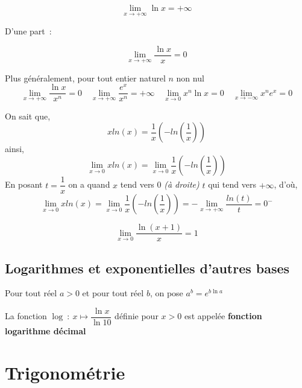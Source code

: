 \documentclass[french]{book}
\newcommand{\ds}{\displaystyle}
\newcommand{\limite}[2][x]{\ds\lim_{#1\rightarrow #2}}
\newcommand{\limpinf}[1][x]{\ds\lim_{#1\rightarrow +\infty}}
\newcommand{\fr}[2]{\dfrac{#1}{#2}}
\begin{document}
\begin{prop}
     $$\limpinf  \ln x=+\infty$$
    \end{prop}


\begin{prop}
D'une part~:

    $$\limpinf \dfrac{\ln x}{x}=0$$

Plus généralement, pour tout entier naturel $n$ non nul $$\limpinf\fr{\ln x}{x^n}=0\quad \limpinf \fr{e^x}{x^n}=+\infty\quad
\limite{0}x^n\ln x=0\quad \limite{-\infty}x^ne^x=0$$

\end{prop}

\begin{demo}[preuve de $ \limite{0} x ln(x)$ ]
On sait que, $$ x ln(x) = \dfrac{1}{x} (- ln( \dfrac{1}{x} )) $$ 
ainsi, 
$$ \limite{0} x ln(x)= \limite{0} \dfrac{1}{x} (- ln( \dfrac{1}{x} ))$$
En posant $t=\dfrac{1}{x}$   on a quand $x$ tend vers 0 \emph{(à droite)} $t$ qui tend vers $+ \infty$, d'où, 
 $$ \limite{0} x ln(x)=\limite{0} \dfrac{1}{x} (- ln( \dfrac{1}{x} )) =- \limpinf \dfrac{ln(t)}{t} = 0^- $$ 
 
 
\end{demo}

\begin{prop}
    $$\limite{0}\frac{\ln(x+1)}{x}=1$$
    \end{prop}



\section{Logarithmes et exponentielles d'autres bases}


\begin{defn}
    Pour tout réel $a>0$ et pour tout réel $b$, on pose $a^b=e^{b\ln a}$
    
    \vspace{3mm}
    \end{defn}
  

\begin{defn}
    La fonction $\log\ :\ x\mapsto \fr{\ln x}{\ln 10}$ définie pour $x>0$ est appelée \textbf{fonction logarithme décimal}
    \end{defn}
  
\chapter{Trigonom\'etrie}
\end{document}
